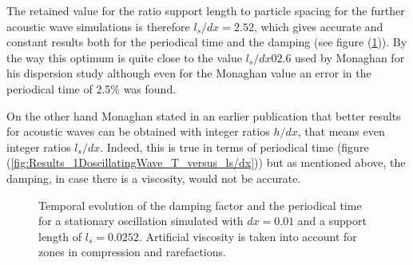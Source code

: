 \documentclass{report}
\begin{document}
The retained value for the ratio support length to particle spacing for the further acoustic wave simulations is therefore $l_s/dx=2.52$, which gives accurate and constant results both for the periodical time and the damping (see figure (\ref{fig:Results_1DoscillatingWave_supLen0252})). By the way this optimum is quite close to the value $l_s/dx02.6$ used by Monaghan for his dispersion study \cite{Monaghan2005} although even for the Monaghan value an error in the periodical time of 2.5\% was found. 

On the other hand Monaghan stated in an earlier publication \cite{Monaghan1992} that better results for acoustic waves can be obtained with integer ratios $h/dx$, that means even integer ratios $l_s/dx$. Indeed, this is true in terms of periodical time (figure (\ref{fig:Results_1DoscillatingWave_T_versus_ls/dx})) but as mentioned above, the damping, in case there is a viscosity, would not be accurate.

\begin{figure}[h]
 \label{fig:Results_1DoscillatingWave_supLen0252}
\centering
{}
\caption[1D Oscillation: Damping factor and periodical time for $l_s/dx=2.52$]{Temporal evolution of the damping factor and the periodical time for a stationary oscillation simulated with $dx=0.01$ and a support length of $l_s=0.0252$. Artificial viscosity is taken into account for zones in compression and rarefactions.}

\end{figure}
\end{document}
